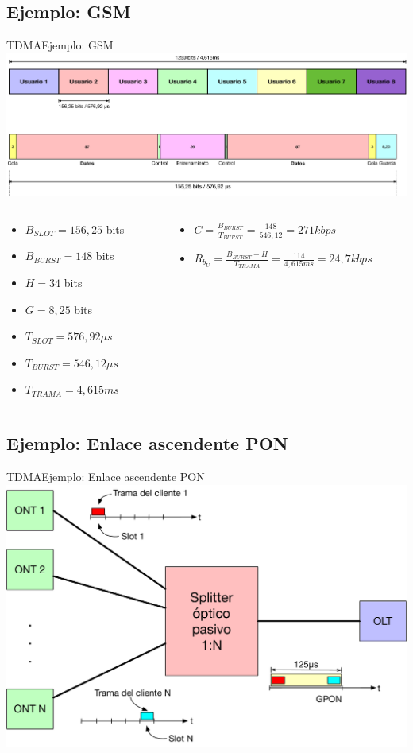 \documentclass[10pt,compress]{beamer} %
\begin{document}
\subsection{Ejemplo: GSM}
\begin{frame}{TDMA}{Ejemplo: GSM}
  \centering \includegraphics[width=0.7\linewidth]{../Apuntes/Figuras/TramaGSM2.pdf}
  \begin{columns}[onlytextwidth]
    \begin{column}{.4\textwidth}
  \begin{itemize}
    \item $B_{SLOT} = 156,25$ bits
    \item $B_{BURST} = 148$ bits
    \item $H = 34$ bits
    \item $G = 8,25$ bits
    \item $T_{SLOT} = 576,92 \mu s$
    \item $T_{BURST} = 546,12 \mu s$
    \item $T_{TRAMA} = 4,615 ms$
  \end{itemize}
\end{column}
  \begin{column}{.6\textwidth}
    \begin{itemize}
      \item $C = \frac{B_{BURST}}{T_{BURST}} = \frac{148}{546,12} = 271 kbps$
      \item $R_{b_U} = \frac{B_{BURST}-H}{T_{TRAMA}} = \frac{114}{4,615 ms} = 24,7 kbps$
    \end{itemize}
  \end{column}
\end{columns}
\end{frame}


\subsection{Ejemplo: Enlace ascendente PON}
\begin{frame}{TDMA}{Ejemplo: Enlace ascendente PON}
  \centering \includegraphics[width=0.8\linewidth]{../Apuntes/Figuras/TDMA_PON.pdf}
\end{frame}
\end{document}
